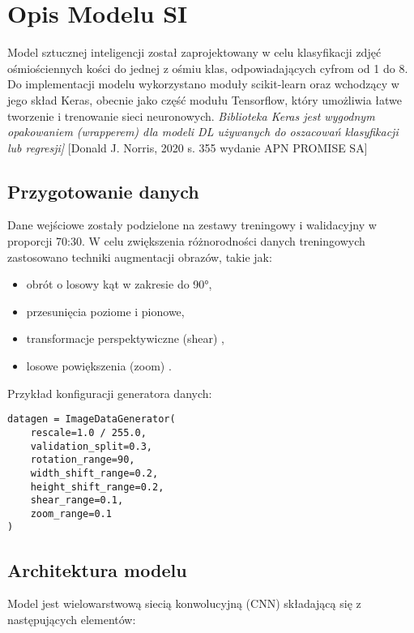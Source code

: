 \section{Opis Modelu SI}\label{sec:opis-modelu-si}

Model sztucznej inteligencji został zaprojektowany w celu klasyfikacji zdjęć ośmiościennych kości do jednej z ośmiu klas, odpowiadających cyfrom od 1 do 8.
Do implementacji modelu wykorzystano moduły scikit-learn oraz wchodzący w jego skład Keras, obecnie jako część modułu Tensorflow, który umożliwia łatwe tworzenie i trenowanie sieci neuronowych.
\textit{Biblioteka Keras jest wygodnym opakowaniem (wrapperem) dla modeli DL używanych do oszacowań klasyfikacji lub regresji]} [Donald J. Norris, 2020 s. 355 wydanie APN PROMISE SA]

\subsection{Przygotowanie danych}\label{subsec:przygotowanie-danych}

Dane wejściowe zostały podzielone na zestawy treningowy i walidacyjny w proporcji 70:30.
W celu zwiększenia różnorodności danych treningowych zastosowano techniki augmentacji obrazów, takie jak:

\begin{itemize}
    \item obrót o losowy kąt w zakresie do 90°,
    \item przesunięcia poziome i pionowe,
    \item transformacje perspektywiczne (shear) ,
    \item losowe powiększenia (zoom) .
\end{itemize}

Przykład konfiguracji generatora danych:

\begin{verbatim}
datagen = ImageDataGenerator(
    rescale=1.0 / 255.0,
    validation_split=0.3,
    rotation_range=90,
    width_shift_range=0.2,
    height_shift_range=0.2,
    shear_range=0.1,
    zoom_range=0.1
)
\end{verbatim}

\subsection{Architektura modelu}\label{subsec:architektura-modelu}

Model jest wielowarstwową siecią konwolucyjną (CNN) składającą się z następujących elementów:

